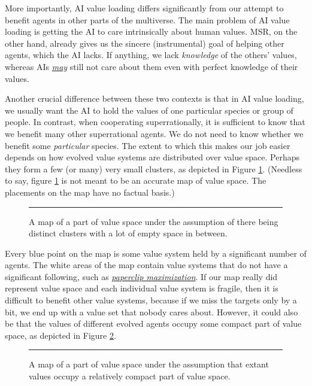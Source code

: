More importantly, AI value loading differs significantly from our
attempt to benefit agents in other parts of the multiverse. The main
problem of AI value loading is getting the AI to care intrinsically
about human values. MSR, on the other hand, already gives us the sincere
(instrumental) goal of helping other agents, which the AI lacks. If
anything, we lack \emph{knowledge} of the others' values, whereas AIs
\href{http://lesswrong.com/lw/igf/the_genie_knows_but_doesnt_care/}{\emph{may}}
still not care about them even with perfect knowledge of their values.

Another crucial difference between these two contexts is that in AI
value loading, we usually want the AI to hold the values of one
particular species or group of people. In contrast, when cooperating
superrationally, it is sufficient to know that we benefit many other
superrational agents. We do not need to know whether we benefit some
\emph{particular} species. The extent to which this makes our job easier
depends on how evolved value systems are distributed over value space.
Perhaps they form a few (or many) very small clusters, as depicted in
Figure \ref{map-of-value-space-with-clusters}.
(Needless to say, figure
\ref{map-of-value-space-with-clusters} is not meant to
be an accurate map of value space. The placements on the map have no
factual basis.)

\begin{figure}[h!]
    \centering
    \rule{2cm}{2cm}
    \caption{A map of a part of value
space under the assumption of there being distinct clusters with a lot
of empty space in between.}
    \label{map-of-value-space-with-clusters}
\end{figure}

Every blue point on the map is some value system held by a significant
number of agents. The white areas of the map contain value systems that
do not have a significant following, such as
\href{https://wiki.lesswrong.com/wiki/Paperclip_maximizer}{\emph{paperclip
maximization}}. If our map really did represent value space and each
individual value system is fragile, then it is difficult to benefit
other value systems, because if we miss the targets only by a bit, we
end up with a value set that nobody cares about. However, it could also
be that the values of different evolved agents occupy some compact part
of value space, as depicted in Figure
\ref{map-of-value-space-compact}.

\begin{figure}[h!]
    \centering
    \rule{2cm}{2cm}
    \caption{A map of a part of value space under the assumption that extant values occupy a
    relatively compact part of value space.}
    \label{map-of-value-space-compact}
\end{figure}

